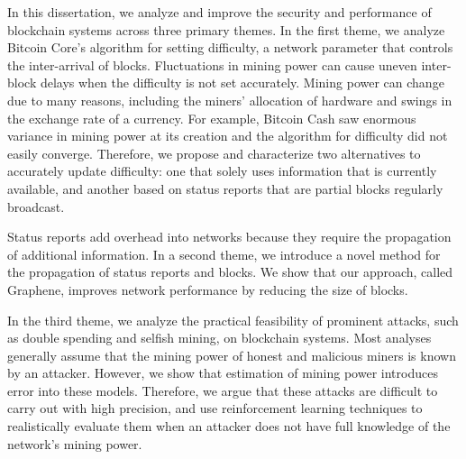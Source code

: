 
In this dissertation, we analyze and improve the security and performance of blockchain systems across three primary themes. In the first theme, we analyze Bitcoin Core's algorithm for setting difficulty, a network parameter that controls the inter-arrival of blocks. Fluctuations in mining power can cause uneven inter-block delays when the difficulty is not set accurately.  Mining power can change due to many reasons, including the miners' allocation of hardware and swings in the exchange rate of a currency.  For example, Bitcoin Cash saw enormous variance in mining power at its creation and the algorithm for difficulty did not easily converge. Therefore, we propose and characterize two alternatives to accurately update difficulty: one that solely uses information that is currently available, and another based on status reports that are partial blocks regularly broadcast.

Status reports add overhead into networks because they require the propagation of additional information. In a second theme, we introduce a novel method for the propagation of status reports and blocks. We show that our approach, called Graphene, improves network performance by reducing the size of blocks.

In the third theme, we analyze the practical feasibility of prominent attacks, such as double spending and selfish mining, on blockchain systems. Most analyses generally assume that the mining power of honest and malicious miners is known by an attacker. However, we show that estimation of mining power introduces error into these models. Therefore, we argue that these attacks are difficult to carry out with high precision, and use reinforcement learning techniques to realistically evaluate them when an attacker does not have full knowledge of the network's mining power.
